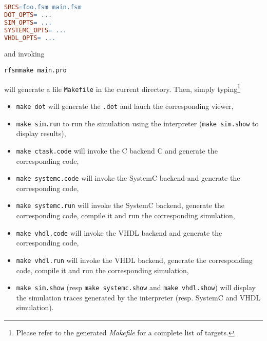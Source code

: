 \begin{lstlisting}[language=make,frame=single]
SRCS=foo.fsm main.fsm
DOT_OPTS= ...
SIM_OPTS= ...
SYSTEMC_OPTS= ...
VHDL_OPTS= ...
\end{lstlisting}

\noindent
and invoking

\begin{verbatim}
rfsmmake main.pro
\end{verbatim}

\noindent
will generate a file \verb|Makefile| in the current directory. 
Then, simply typing\footnote{Please refer to the generated \emph{Makefile} for
  a complete list of targets.}
  \begin{itemize}
  \item \verb|make dot| will generate the \verb|.dot| and lauch the corresponding viewer,
  \item \verb|make sim.run| to run the simulation using the interpreter (\verb|make sim.show| to display results),
  \item \verb|make ctask.code| will invoke the C backend C and generate the corresponding code,
  \item \verb|make systemc.code| will invoke the SystemC backend  and generate the corresponding code,
  \item \verb|make systemc.run| will invoke the SystemC backend, generate the corresponding
    code, compile it and run the corresponding simulation,
  \item \verb|make vhdl.code| will invoke the VHDL backend  and generate the corresponding code,
  \item \verb|make vhdl.run| will invoke the VHDL backend, generate the corresponding
    code, compile it and run the corresponding simulation,
  \item \verb|make sim.show| (resp \verb|make systemc.show| and \verb|make vhdl.show|) will display
    the simulation traces generated by the interpreter (resp. SystemC and VHDL simulation).
  \end{itemize}


